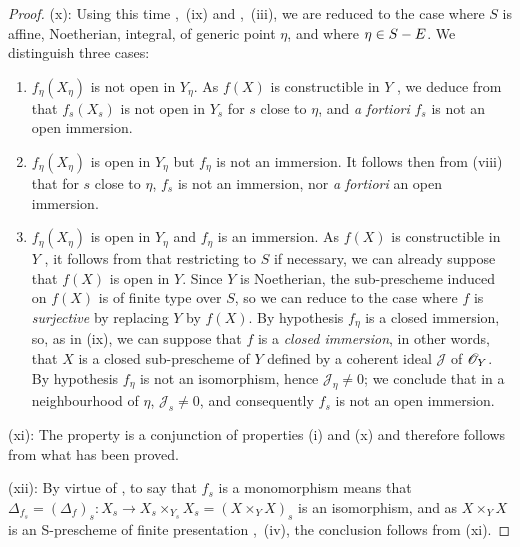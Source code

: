 \begin{proof}
(x): Using this time ,~(ix) and ,~(iii), we are reduced to the case where $S$ is affine, Noetherian, integral, of generic point $\eta$, and where $\eta\in S- E$.
We distinguish three cases:
\begin{enumerate}[label=\upshape{$\arabic{enumi}^\circ$}]
  \item $f_\eta(X_\eta)$ is not open in $Y_\eta$.
  As $f(X)$ is constructible in $Y$ , we deduce from  that $f_s(X_s)$ is not open in $Y_s$ for $s$ close to $\eta$, and \emph{a fortiori} $f_s$ is not an open immersion.

  \item $f_\eta(X_\eta)$ is open in $Y_\eta$ but $f_\eta$ is not an immersion.
  It follows then from (viii) that for $s$ close to $\eta$, $f_s$ is not an immersion, nor \emph{a fortiori} an open immersion.

  \item $f_\eta(X_\eta)$ is open in $Y_\eta$ and $f_\eta$ is an immersion.
  As $f(X)$ is constructible in $Y$ , it follows from  that restricting to $S$ if necessary, we can already suppose that $f(X)$ is open in $Y$.
  Since $Y$ is Noetherian, the sub-prescheme induced on $f(X)$ is of finite type over $S$, so we can reduce to the case where $f$ is \emph{surjective} by replacing $Y$ by $f(X)$.
  By hypothesis $f_\eta$ is a closed immersion, so, as in (ix), we can suppose that $f$ is a \emph{closed immersion}, in other words, that $X$ is a closed sub-prescheme of $Y$ defined by a coherent ideal $\mathscr{J}$ of $\mathscr{O}_Y$.
  By hypothesis $f_\eta$ is not an isomorphism, hence $\mathscr{J}_\eta\neq 0$; we conclude  that in a neighbourhood of $\eta$, $\mathscr{J}_s\neq 0$, and consequently $f_s$ is not an open immersion.
\end{enumerate}

(xi): The property is a conjunction of properties (i) and (x) and therefore follows from what has been proved.

(xii): By virtue of , to say that $f_s$ is a monomorphism means that $\Delta_{f_s}=(\Delta_f)_s:X_s\to X_s\times_{Y_s} X_s=(X\times_Y X)_s$ is an isomorphism, and as $X\times_Y X$ is an S-prescheme of finite presentation ,~(iv), the conclusion follows from (xi).
\end{proof}

